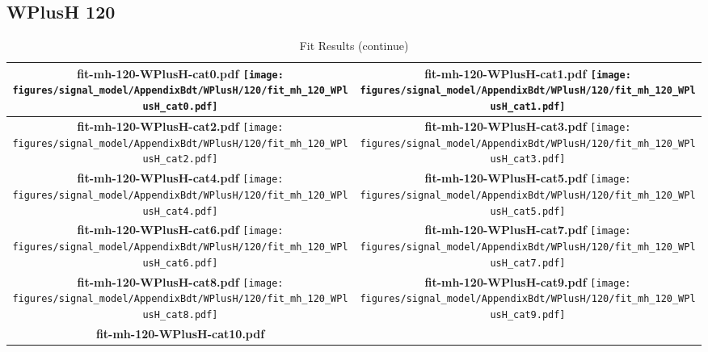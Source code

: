 \subsection{WPlusH 120}
\begin{longtable}{|c|c|}
\caption{Fit Results}
\endfirsthead
\caption{Fit Results (continue)}
\endhead
\hline
\parbox{0.47\textwidth}{
\centering
{\bfseries fit-mh-120-WPlusH-cat0.pdf}
\texttt{[image: figures/signal\_model/AppendixBdt/WPlusH/120/fit\_mh\_120\_WPlusH\_cat0.pdf]}
}
 & \parbox{0.47\textwidth}{
\centering
{\bfseries fit-mh-120-WPlusH-cat1.pdf}
\texttt{[image: figures/signal\_model/AppendixBdt/WPlusH/120/fit\_mh\_120\_WPlusH\_cat1.pdf]}
}
 \\
\hline
\parbox{0.47\textwidth}{
\centering
{\bfseries fit-mh-120-WPlusH-cat2.pdf}
\texttt{[image: figures/signal\_model/AppendixBdt/WPlusH/120/fit\_mh\_120\_WPlusH\_cat2.pdf]}
}
 & \parbox{0.47\textwidth}{
\centering
{\bfseries fit-mh-120-WPlusH-cat3.pdf}
\texttt{[image: figures/signal\_model/AppendixBdt/WPlusH/120/fit\_mh\_120\_WPlusH\_cat3.pdf]}
}
 \\
\hline
\parbox{0.47\textwidth}{
\centering
{\bfseries fit-mh-120-WPlusH-cat4.pdf}
\texttt{[image: figures/signal\_model/AppendixBdt/WPlusH/120/fit\_mh\_120\_WPlusH\_cat4.pdf]}
}
 & \parbox{0.47\textwidth}{
\centering
{\bfseries fit-mh-120-WPlusH-cat5.pdf}
\texttt{[image: figures/signal\_model/AppendixBdt/WPlusH/120/fit\_mh\_120\_WPlusH\_cat5.pdf]}
}
 \\
\hline
\parbox{0.47\textwidth}{
\centering
{\bfseries fit-mh-120-WPlusH-cat6.pdf}
\texttt{[image: figures/signal\_model/AppendixBdt/WPlusH/120/fit\_mh\_120\_WPlusH\_cat6.pdf]}
}
 & \parbox{0.47\textwidth}{
\centering
{\bfseries fit-mh-120-WPlusH-cat7.pdf}
\texttt{[image: figures/signal\_model/AppendixBdt/WPlusH/120/fit\_mh\_120\_WPlusH\_cat7.pdf]}
}
 \\
\hline
\parbox{0.47\textwidth}{
\centering
{\bfseries fit-mh-120-WPlusH-cat8.pdf}
\texttt{[image: figures/signal\_model/AppendixBdt/WPlusH/120/fit\_mh\_120\_WPlusH\_cat8.pdf]}
}
 & \parbox{0.47\textwidth}{
\centering
{\bfseries fit-mh-120-WPlusH-cat9.pdf}
\texttt{[image: figures/signal\_model/AppendixBdt/WPlusH/120/fit\_mh\_120\_WPlusH\_cat9.pdf]}
}
 \\
\hline
\parbox{0.47\textwidth}{
\centering
{\bfseries fit-mh-120-WPlusH-cat10.pdf}
}
\end{longtable}
